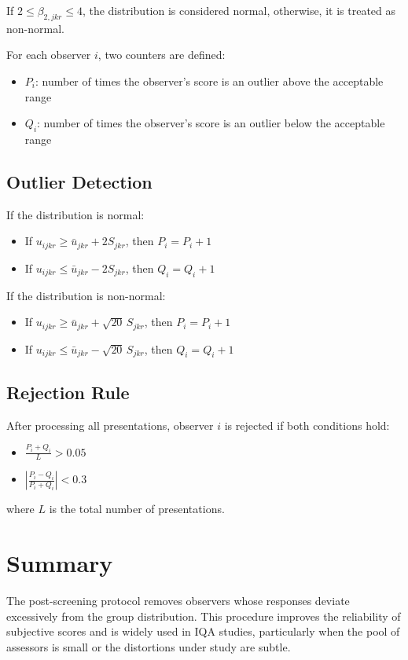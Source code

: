 If $2 \leq \beta_{2,jkr} \leq 4$, the distribution is considered normal, otherwise, it is treated as non-normal.

For each observer $i$, two counters are defined:
\begin{itemize}
  \item $P_i$: number of times the observer's score is an outlier above the acceptable range  
  \item $Q_i$: number of times the observer's score is an outlier below the acceptable range  
\end{itemize}

\subsection{Outlier Detection}

If the distribution is normal:
\begin{itemize}
  \item If $u_{ijkr} \geq \bar{u}_{jkr} + 2 S_{jkr}$, then $P_i = P_i + 1$  
  \item If $u_{ijkr} \leq \bar{u}_{jkr} - 2 S_{jkr}$, then $Q_i = Q_i + 1$  
\end{itemize}

\noindent If the distribution is non-normal:
\begin{itemize}
  \item If $u_{ijkr} \geq \bar{u}_{jkr} + \sqrt{20} \, S_{jkr}$, then $P_i = P_i + 1$  
  \item If $u_{ijkr} \leq \bar{u}_{jkr} - \sqrt{20} \, S_{jkr}$, then $Q_i = Q_i + 1$  
\end{itemize}

\subsection{Rejection Rule}

After processing all presentations, observer $i$ is rejected if both conditions hold:
\begin{itemize}
  \item $\frac{P_i + Q_i}{L} > 0.05$  
  \item $\left| \frac{P_i - Q_i}{P_i + Q_i} \right| < 0.3$  
\end{itemize}
where $L$ is the total number of presentations.

\section{Summary}

The post-screening protocol removes observers whose responses deviate excessively from the group distribution. This procedure improves the reliability of subjective scores and is widely used in IQA studies, particularly when the pool of assessors is small or the distortions under study are subtle.
